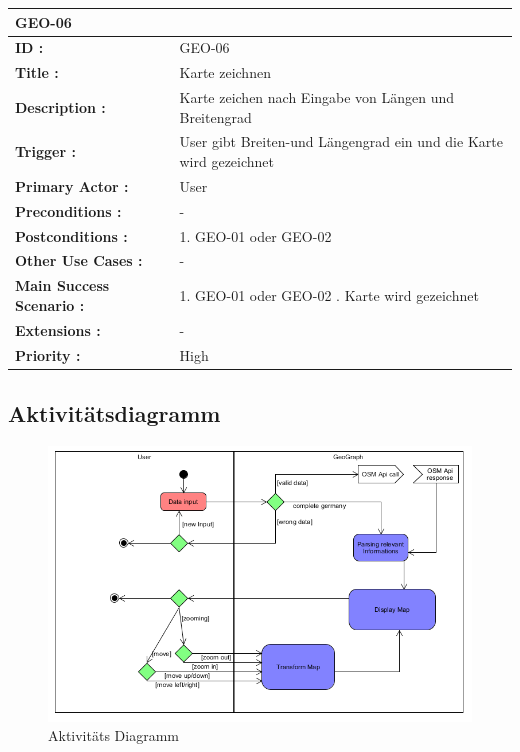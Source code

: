	\begin{table}[H]
		\begin{tabular}{|p{8cm}|p{8cm}|}
			\hline
			\textbf{GEO-06 } \\ 
			\hline
			\textbf{ID :}\centering & GEO-06  \\ \hline 
			\textbf{Title :}\centering & Karte zeichnen \\ \hline 
			\textbf{Description :}\centering & Karte zeichen nach Eingabe von Längen und Breitengrad \\ \hline 
			\textbf{Trigger :}\centering & User gibt Breiten-und Längengrad ein und die Karte wird gezeichnet \\ \hline 
			\textbf{Primary Actor :} \centering & User \\ \hline 
			\textbf{Preconditions :}\centering & -
			 \\ \hline 
			\textbf{Postconditions :}\centering	& 
			1. GEO-01 oder GEO-02 \\ \hline		
			\textbf{Other Use Cases :}\centering & - \\ \hline  
			\textbf{Main Success Scenario :}\centering &
			1. GEO-01 oder GEO-02 \newline
			2. Karte wird gezeichnet \\ \hline  
			\textbf{Extensions :}\centering & - \\ \hline  
			\textbf{Priority :}\centering & High \\ \hline  
		\end{tabular}
	\end{table}		
	
	\subsection{Aktivitätsdiagramm}
		\begin{figure}[H]
			\centering
			\includegraphics[width=0.7\linewidth]{images/Ablauf}
			\caption{Aktivitäts Diagramm}
			\label{fig:Aktivitäts Diagramm}
		\end{figure}
